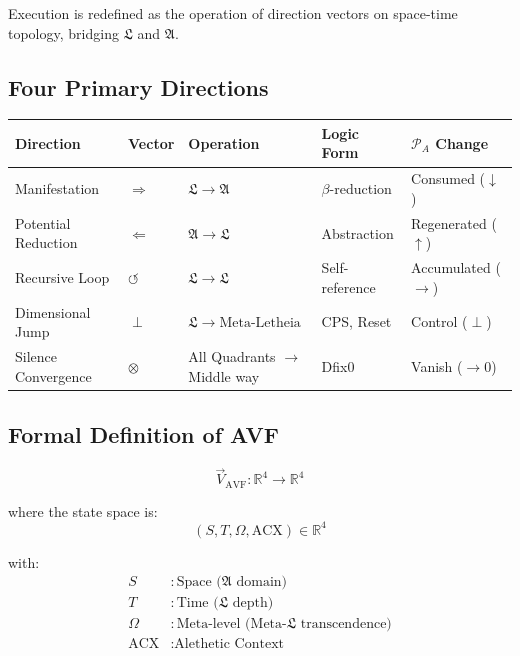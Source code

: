 \documentclass[12pt,a4paper]{article}
\theoremstyle{definition}
\newcommand{\aletheia}{\mathfrak{A}}
\newcommand{\letheia}{\mathfrak{L}}
\newcommand{\powa}{\mathcal{P}_A}
\begin{document}
Execution is redefined as the operation of direction vectors on space-time topology, bridging $\letheia$ and $\aletheia$.

\subsection{Four Primary Directions}

\begin{table}[h]
\centering
\small
\begin{tabular}{|l|l|l|l|l|}
\hline
\textbf{Direction} & \textbf{Vector} & \textbf{Operation} & \textbf{Logic Form} & $\powa$ \textbf{Change} \\
\hline
Manifestation & $\Rightarrow$ & $\letheia \to \aletheia$ & $\beta$-reduction & Consumed ($\downarrow$) \\
\hline
Potential Reduction & $\Leftarrow$ & $\aletheia \to \letheia$ & Abstraction & Regenerated ($\uparrow$) \\
\hline
Recursive Loop & $\circlearrowleft$ & $\letheia \to \letheia$ & Self-reference & Accumulated ($\rightarrow$) \\
\hline
Dimensional Jump & $\perp$ & $\letheia \to \text{Meta-Letheia}$ & CPS, Reset & Control ($\perp$) \\
\hline
Silence Convergence & $\otimes$ & All Quadrants $\to$ Middle way & Dfix0 & Vanish ($\to 0$) \\
\hline
\end{tabular}
\end{table}

\subsection{Formal Definition of AVF}

\begin{equation}
\vec{V}_{\text{AVF}} : \mathbb{R}^4 \to \mathbb{R}^4
\end{equation}

where the state space is:
\begin{equation}
(S, T, \Omega, \text{ACX}) \in \mathbb{R}^4
\end{equation}

with:
\begin{align}
S &: \text{Space ($\aletheia$ domain)} \\
T &: \text{Time ($\letheia$ depth)} \\
\Omega &: \text{Meta-level (Meta-$\letheia$ transcendence)} \\
\text{ACX} &: \text{Alethetic Context}
\end{align}
\end{document}
